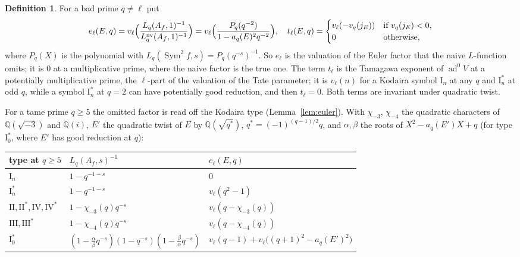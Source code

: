 \documentclass[11pt]{amsart}
\theoremstyle{definition}
\newtheorem{definition}[theorem]{Definition}
\newcommand{\Q}{\mathbb{Q}}
\newcommand{\ad}{\operatorname{ad}^0}
\newcommand{\Sym}{\operatorname{Sym}^2}
\newcommand{\nv}{\mathrm{nv}}
\begin{document}
\begin{definition}\label{def:terms}
For a bad prime $q\ne\ell$ put
\[
e_\ell(E,q)=v_\ell\Bigl(\frac{L_q(A_f,1)^{-1}}{L_q^{\nv}(A_f,1)^{-1}}\Bigr)=v_\ell\Bigl(\frac{P_q(q^{-2})}{1-a_q(E)^2q^{-2}}\Bigr),\quad
t_\ell(E,q)=\begin{cases}v_\ell(-v_q(j_E))&\text{if }v_q(j_E)<0,\\0&\text{otherwise,}\end{cases}
\]
where $P_q(X)$ is the polynomial with $L_q(\Sym f,s)=P_q(q^{-s})^{-1}$. So $e_\ell$ is the valuation of the Euler factor that the naive $L$-function omits; it is $0$ at a multiplicative prime, where the naive factor is the true one. The term $t_\ell$ is the Tamagawa exponent of $\ad V$ at a potentially multiplicative prime, the $\ell$-part of the valuation of the Tate parameter; it is $v_\ell(n)$ for a Kodaira symbol $\mathrm{I}_n$ at any $q$ and $\mathrm{I}_n^*$ at odd $q$, while a symbol $\mathrm{I}_n^*$ at $q=2$ can have potentially good reduction, and then $t_\ell=0$. Both terms are invariant under quadratic twist.
\end{definition}

For a tame prime $q\ge5$ the omitted factor is read off the Kodaira type (Lemma~\ref{lem:euler}). With $\chi_{-3}$, $\chi_{-4}$ the quadratic characters of $\Q(\sqrt{-3})$ and $\Q(i)$, $E'$ the quadratic twist of $E$ by $\Q(\sqrt{q^*})$, $q^*=(-1)^{(q-1)/2}q$, and $\alpha,\beta$ the roots of $X^2-a_q(E')X+q$ (for type $\mathrm{I}_0^*$, where $E'$ has good reduction at $q$):
\begin{center}\footnotesize\setlength{\tabcolsep}{4pt}
\begin{tabular}{lll}
\toprule
type at $q\ge5$ & $L_q(A_f,s)^{-1}$ & $e_\ell(E,q)$\\
\midrule
$\mathrm{I}_n$ & $1-q^{-1-s}$ & $0$\\
$\mathrm{I}_n^*$ & $1-q^{-1-s}$ & $v_\ell(q^2-1)$\\
$\mathrm{II},\mathrm{II}^*,\mathrm{IV},\mathrm{IV}^*$ & $1-\chi_{-3}(q)q^{-s}$ & $v_\ell(q-\chi_{-3}(q))$\\
$\mathrm{III},\mathrm{III}^*$ & $1-\chi_{-4}(q)q^{-s}$ & $v_\ell(q-\chi_{-4}(q))$\\
$\mathrm{I}_0^*$ & $(1-\tfrac{\alpha}{\beta}q^{-s})(1-q^{-s})(1-\tfrac{\beta}{\alpha}q^{-s})$ & $v_\ell(q-1)+v_\ell\bigl((q+1)^2-a_q(E')^2\bigr)$\\
\bottomrule
\end{tabular}
\end{center}
\end{document}
